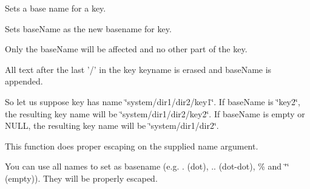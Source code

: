 Sets a base name for a key.

Sets {\ttfamily base\-Name} as the new basename for {\ttfamily key}.

Only the base\-Name will be affected and no other part of the key.

All text after the last {\ttfamily '/'} in the {\ttfamily key} keyname is erased and {\ttfamily base\-Name} is appended.

So let us suppose {\ttfamily key} has name {\ttfamily \char`\"{}system/dir1/dir2/key1\char`\"{}}. If {\ttfamily base\-Name} is {\ttfamily \char`\"{}key2\char`\"{}}, the resulting key name will be {\ttfamily \char`\"{}system/dir1/dir2/key2\char`\"{}}. If {\ttfamily base\-Name} is empty or N\-U\-L\-L, the resulting key name will be {\ttfamily \char`\"{}system/dir1/dir2\char`\"{}}.

This function does proper escaping on the supplied name argument.

You can use all names to set as basename (e.\-g. . (dot), .. (dot-\/dot), \% and \char`\"{}\char`\"{} (empty)). They will be properly escaped.

